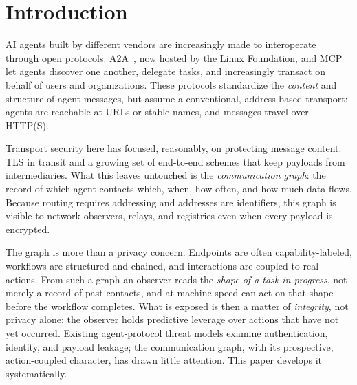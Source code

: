 \documentclass[10pt,twocolumn]{article}
\theoremstyle{definition}
\begin{document}
\section{Introduction}\label{sec:intro}
AI agents built by different vendors are increasingly made to interoperate through
open protocols. A2A~\citep{a2a}, now hosted by the Linux Foundation, and MCP~\citep{mcp} let agents
discover one another, delegate tasks, and increasingly transact on behalf of users and
organizations. These protocols standardize the \emph{content} and structure of agent
messages, but assume a conventional, address-based transport: agents are reachable
at URLs or stable names, and messages travel over HTTP(S).

Transport security here has focused, reasonably, on protecting message content: TLS
in transit and a growing set of end-to-end schemes that keep payloads from
intermediaries. What this leaves untouched is the \emph{communication graph}: the
record of which agent contacts which, when, how often, and how much data flows.
Because routing requires addressing and addresses are identifiers, this graph is
visible to network observers, relays, and registries even when every payload is
encrypted.

The graph is more than a privacy concern. Endpoints are often capability-labeled,
workflows are structured and chained, and interactions are coupled to real actions.
From such a graph an observer reads the \emph{shape of a task in progress}, not merely
a record of past contacts, and at machine speed can act on that shape before the
workflow completes. What is exposed is then a matter of \emph{integrity}, not privacy
alone: the observer holds predictive leverage over actions that have not yet occurred.
Existing agent-protocol threat models examine authentication, identity, and payload
leakage; the communication graph, with its prospective, action-coupled character, has
drawn little attention. This paper develops it systematically.
\end{document}
